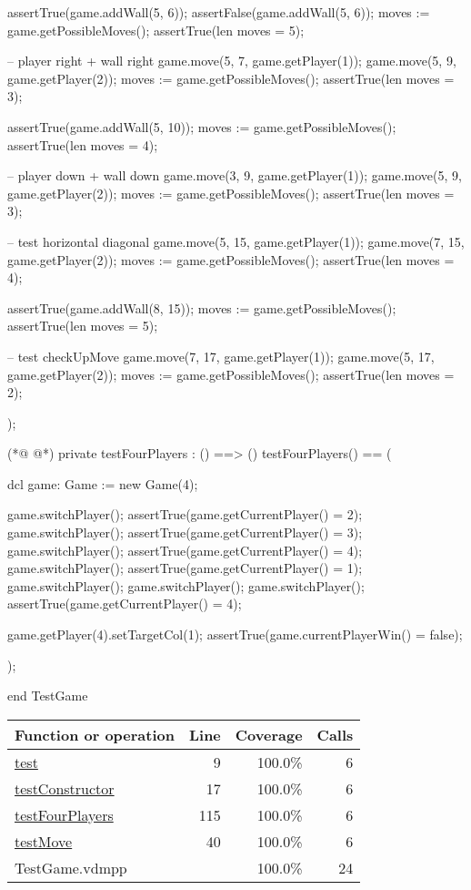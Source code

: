 \begin{vdmpp}[breaklines=true]
  assertTrue(game.addWall(5, 6));
  assertFalse(game.addWall(5, 6));
  moves := game.getPossibleMoves();
  assertTrue(len moves = 5);
  
  -- player right + wall right
  game.move(5, 7, game.getPlayer(1));
  game.move(5, 9, game.getPlayer(2));
  moves := game.getPossibleMoves();
  assertTrue(len moves = 3);
  
  assertTrue(game.addWall(5, 10));
  moves := game.getPossibleMoves();
  assertTrue(len moves = 4);
  
  -- player down + wall down
  game.move(3, 9, game.getPlayer(1));
  game.move(5, 9, game.getPlayer(2));
  moves := game.getPossibleMoves();
  assertTrue(len moves = 3);
  
  -- test horizontal diagonal
  game.move(5, 15, game.getPlayer(1));
  game.move(7, 15, game.getPlayer(2));
  moves := game.getPossibleMoves();
  assertTrue(len moves = 4);
  
  assertTrue(game.addWall(8, 15));
  moves := game.getPossibleMoves();
  assertTrue(len moves = 5);
  
  -- test checkUpMove
  game.move(7, 17, game.getPlayer(1));
  game.move(5, 17, game.getPlayer(2));
  moves := game.getPossibleMoves();
  assertTrue(len moves = 2);
  
 );
 
(*@
\label{testFourPlayers:115}
@*)
 private testFourPlayers : () ==> ()
 testFourPlayers() ==
 (
 
  dcl
  game: Game := new Game(4);
  
  game.switchPlayer();
  assertTrue(game.getCurrentPlayer() = 2);
  game.switchPlayer();
  assertTrue(game.getCurrentPlayer() = 3);
  game.switchPlayer();
  assertTrue(game.getCurrentPlayer() = 4);
  game.switchPlayer();
  assertTrue(game.getCurrentPlayer() = 1);
  game.switchPlayer();
  game.switchPlayer();
  game.switchPlayer();
  assertTrue(game.getCurrentPlayer() = 4);
  
  game.getPlayer(4).setTargetCol(1);
  assertTrue(game.currentPlayerWin() = false);
 
 );
 
end TestGame
\end{vdmpp}
\bigskip
\begin{longtable}{|l|r|r|r|}
\hline
Function or operation & Line & Coverage & Calls \\
\hline
\hline
\hyperref[test:9]{test} & 9&100.0\% & 6 \\
\hline
\hyperref[testConstructor:17]{testConstructor} & 17&100.0\% & 6 \\
\hline
\hyperref[testFourPlayers:115]{testFourPlayers} & 115&100.0\% & 6 \\
\hline
\hyperref[testMove:40]{testMove} & 40&100.0\% & 6 \\
\hline
\hline
TestGame.vdmpp & & 100.0\% & 24 \\
\hline
\end{longtable}

